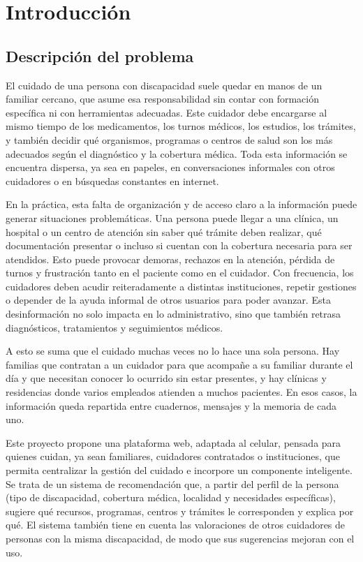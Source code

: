 
\chapter{Introducción}\label{cap:introduccion}

\section{Descripción del problema}

El cuidado de una persona con discapacidad suele quedar en manos de un familiar cercano, que asume esa responsabilidad sin contar con formación específica ni con herramientas adecuadas. Este cuidador debe encargarse al mismo tiempo de los medicamentos, los turnos médicos, los estudios, los trámites, y también decidir qué organismos, programas o centros de salud son los más adecuados según el diagnóstico y la cobertura médica. Toda esta información se encuentra dispersa, ya sea en papeles, en conversaciones informales con otros cuidadores o en búsquedas constantes en internet.

En la práctica, esta falta de organización y de acceso claro a la información puede generar situaciones problemáticas. Una persona puede llegar a una clínica, un hospital o un centro de atención sin saber qué trámite deben realizar, qué documentación presentar o incluso si cuentan con la cobertura necesaria para ser atendidos. Esto puede provocar demoras, rechazos en la atención, pérdida de turnos y frustración tanto en el paciente como en el cuidador. Con frecuencia, los cuidadores deben acudir reiteradamente a distintas instituciones, repetir gestiones o depender de la ayuda informal de otros usuarios para poder avanzar. Esta desinformación no solo impacta en lo administrativo, sino que también retrasa diagnósticos, tratamientos y seguimientos médicos.

A esto se suma que el cuidado muchas veces no lo hace una sola persona. Hay familias que contratan a un cuidador para que acompañe a su familiar durante el día y que necesitan conocer lo ocurrido sin estar presentes, y hay clínicas y residencias donde varios empleados atienden a muchos pacientes. En esos casos, la información queda repartida entre cuadernos, mensajes y la memoria de cada uno.

Este proyecto propone una plataforma web, adaptada al celular, pensada para quienes cuidan, ya sean familiares, cuidadores contratados o instituciones, que permita centralizar la gestión del cuidado e incorpore un componente inteligente. Se trata de un sistema de recomendación que, a partir del perfil de la persona (tipo de discapacidad, cobertura médica, localidad y necesidades específicas), sugiere qué recursos, programas, centros y trámites le corresponden y explica por qué. El sistema también tiene en cuenta las valoraciones de otros cuidadores de personas con la misma discapacidad, de modo que sus sugerencias mejoran con el uso.


